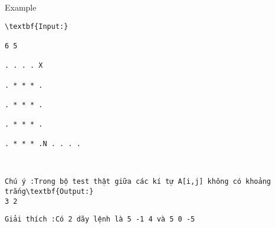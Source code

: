Example
\begin{verbatim}
\textbf{Input:}

6 5

. . . . X

. * * * .

. * * * .

. * * * .

. * * * .N . . . .\end{verbatim}
\begin{verbatim}


Chú ý :Trong bộ test thật giữa các kí tự A[i,j] không có khoảng trắng\textbf{Output:}
3 2\end{verbatim}
\begin{verbatim}
Giải thích :Có 2 dãy lệnh là 5 -1 4 và 5 0 -5\end{verbatim}